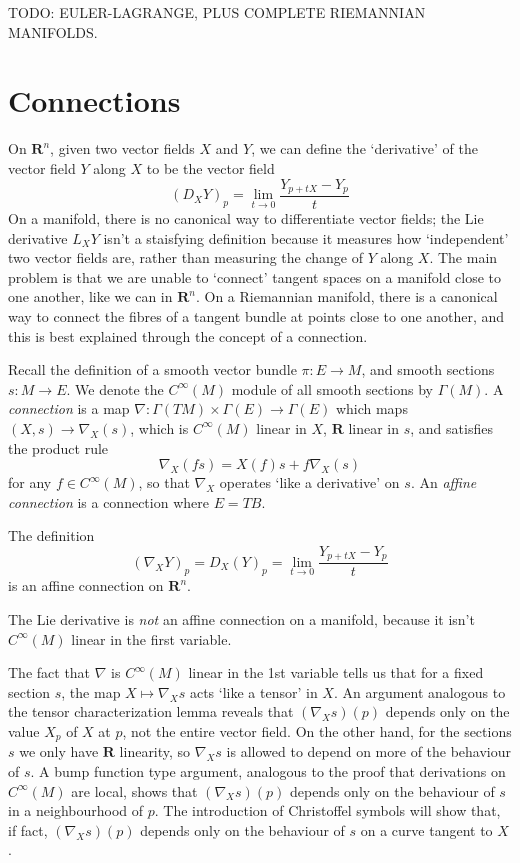 TODO: EULER-LAGRANGE, PLUS COMPLETE RIEMANNIAN MANIFOLDS.

\section{Connections}

On $\mathbf{R}^n$, given two vector fields $X$ and $Y$, we can define the `derivative' of the vector field $Y$ along $X$ to be the vector field
%
\[ (D_X Y)_p = \lim_{t \to 0} \frac{Y_{p + tX} - Y_p}{t} \]
%
On a manifold, there is no canonical way to differentiate vector fields; the Lie derivative $L_XY$ isn't a staisfying definition because it measures how `independent' two vector fields are, rather than measuring the change of $Y$ along $X$. The main problem is that we are unable to `connect' tangent spaces on a manifold close to one another, like we can in $\mathbf{R}^n$. On a Riemannian manifold, there is a canonical way to connect the fibres of a tangent bundle at points close to one another, and this is best explained through the concept of a connection.

Recall the definition of a smooth vector bundle $\pi: E \to M$, and smooth sections $s: M \to E$. We denote the $C^\infty(M)$ module of all smooth sections by $\Gamma(M)$. A \emph{connection} is a map $\nabla: \Gamma(TM) \times \Gamma(E) \to \Gamma(E)$ which maps $(X,s) \to \nabla_X(s)$, which is $C^\infty(M)$ linear in $X$, $\mathbf{R}$ linear in $s$, and satisfies the product rule
%
\[ \nabla_X(fs) = X(f)s + f\nabla_X(s) \]
%
for any $f \in C^\infty(M)$, so that $\nabla_X$ operates `like a derivative' on $s$. An \emph{affine connection} is a connection where $E = TB$.

\begin{example}
    The definition
    \[ (\nabla_X Y)_p = D_X(Y)_p = \lim_{t \to 0} \frac{Y_{p + tX} - Y_p}{t} \]
    is an affine connection on $\mathbf{R}^n$.
\end{example}

\begin{example}
    The Lie derivative is {\it not} an affine connection on a manifold, because it isn't $C^\infty(M)$ linear in the first variable.
\end{example}

The fact that $\nabla$ is $C^\infty(M)$ linear in the 1st variable tells us that for a fixed section $s$, the map $X \mapsto \nabla_X s$ acts `like a tensor' in $X$. An argument analogous to the tensor characterization lemma reveals that $(\nabla_X s)(p)$ depends only on the value $X_p$ of $X$ at $p$, not the entire vector field. On the other hand, for the sections $s$ we only have $\mathbf{R}$ linearity, so $\nabla_X s$ is allowed to depend on more of the behaviour of $s$. A bump function type argument, analogous to the proof that derivations on $C^\infty(M)$ are local, shows that $(\nabla_X s)(p)$ depends only on the behaviour of $s$ in a neighbourhood of $p$. The introduction of Christoffel symbols will show that, if fact, $(\nabla_X s)(p)$ depends only on the behaviour of $s$ on a curve tangent to $X$.

